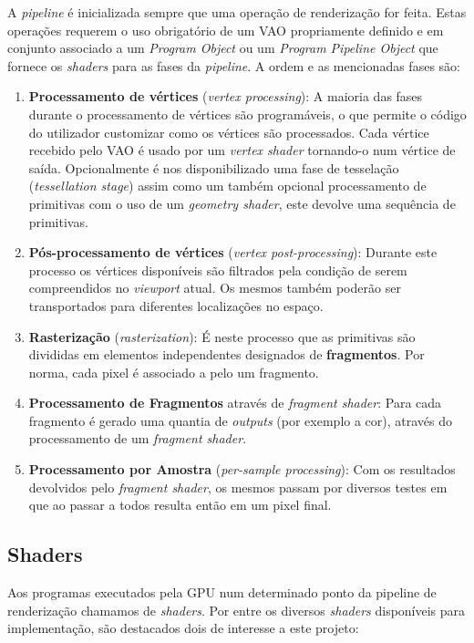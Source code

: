 A \textit{pipeline} é inicializada sempre que uma operação de renderização for feita. Estas operações requerem o uso obrigatório de um \ac{VAO} propriamente definido e em conjunto associado a um \textit{Program Object} ou um \textit{Program Pipeline Object} que fornece os \textit{shaders} para as fases da \textit{pipeline}. 
A ordem e as mencionadas fases são:
\begin{enumerate}
    \item \textbf{Processamento de vértices} (\textit{vertex processing}): 
    A maioria das fases durante o processamento de vértices são programáveis, o que permite o código do utilizador customizar como os vértices são processados.
    Cada vértice recebido pelo \ac{VAO} é usado por um \textit{vertex shader} tornando-o num vértice de saída. Opcionalmente é nos disponibilizado uma fase de tesselação (\textit{tessellation stage}) assim como um também opcional processamento de primitivas com o uso de um \textit{geometry shader}, este devolve uma sequência de primitivas.
    
    \item \textbf{Pós-processamento de vértices} (\textit{vertex post-processing}):
    Durante este processo os vértices disponíveis são filtrados pela condição de serem compreendidos no \textit{viewport} atual. Os mesmos também poderão ser transportados para diferentes localizações no espaço.
    
    \item \textbf{Rasterização} (\textit{rasterization}): É neste processo que as primitivas são divididas em elementos independentes designados de \textbf{fragmentos}. Por norma, cada pixel é associado a pelo um fragmento.
    
    \item \textbf{Processamento de Fragmentos} através de \textit{fragment shader}: Para cada fragmento é gerado uma quantia de \textit{outputs} (por exemplo a cor), através do processamento de um \textit{fragment shader}.
    
    \item \textbf{Processamento por Amostra} (\textit{per-sample processing}): Com os resultados devolvidos pelo \textit{fragment shader}, os mesmos passam por diversos testes em que ao passar a todos resulta então em um pixel final.
\end{enumerate}

\subsection{Shaders}
Aos programas executados pela \ac{GPU} num determinado ponto da pipeline de renderização chamamos de \textit{shaders}. Por entre os diversos \textit{shaders} disponíveis para implementação, são destacados dois de interesse a este projeto:

